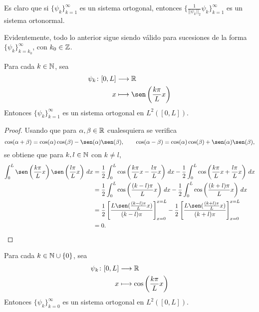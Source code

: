 \documentclass[a4paper, 12pt, extrafontsizes]{memoir}
\begin{document}
Es claro que si $\{\psi_k\}_{k=1}^\infty$ es un sistema ortogonal, entonces $\{\frac{1}{||\psi_k||_2}\psi_k\}_{k=1}^\infty$ es un sistema ortonormal.

Evidentemente, todo lo anterior sigue siendo válido para sucesiones de la forma $\{\psi_k\}_{k=k_0}^\infty$, con $k_0 \in \mathbb Z$.

\begin{proposition}
    Para cada $k \in \mathbb N$, sea
    \begin{align*}
        \psi_k \colon [0,L] &\longrightarrow \R \\
        x &\longmapsto \sen\left(\frac{k\pi}{L}x \right)
    \end{align*}
    Entonces $\{\psi_k\}_{k=1}^\infty$ es un sistema ortogonal en $L^2([0,L])$.
\end{proposition}

\begin{proof}
Usando que para $\alpha,\beta\in \mathbb R$ cualesquiera se verifica
\[\cos(\alpha+\beta) = \cos(\alpha)\cos(\beta)-\sen(\alpha)\sen(\beta), \qquad \cos(\alpha-\beta) = \cos(\alpha)\cos(\beta)+\sen(\alpha)\sen(\beta),\]    
se obtiene que para $k,l \in \mathbb N$ con $k \neq l$,
\begin{align*}
\int_0^L\sen\left(\frac{k\pi}{L}x\right)\sen\left(\frac{l\pi}{L}x\right) \, dx  &=\frac{1}{2}\int_0^L\cos\left(\frac{k\pi}{L}x -\frac{l\pi}{L}x\right) \, dx-\frac{1}{2}\int_0^L\cos\left(\frac{k\pi}{L}x +\frac{l\pi}{L}x\right) \, dx \\
&=\frac{1}{2}\int_0^L\cos\left(\frac{(k-l)\pi}{L}x\right) \, dx-\frac{1}{2}\int_0^L\cos\left(\frac{(k+l)\pi}{L}x\right) \, dx \\
&=\frac{1}{2}\left[\frac{L\sen(\frac{(k-l)\pi}{L}x)}{(k-l)\pi}\right]_{x=0}^{x=L}-\frac{1}{2}\left[\frac{L\sen(\frac{(k+l)\pi}{L}x)}{(k+l)\pi}\right]_{x=0}^{x=L} \\
&= 0. \qedhere
\end{align*} 
\end{proof}

\begin{proposition}
    Para cada $k \in \mathbb N \cup \{0\}$, sea
    \begin{align*}
        \psi_k \colon [0,L] &\longrightarrow \mathbb R \\
        x &\longmapsto \cos\left(\frac{k\pi}{L}x \right)
    \end{align*}
    Entonces $\{\psi_k\}_{k=0}^\infty$ es un sistema ortogonal en $L^2([0,L])$.
\end{proposition}
\end{document}
